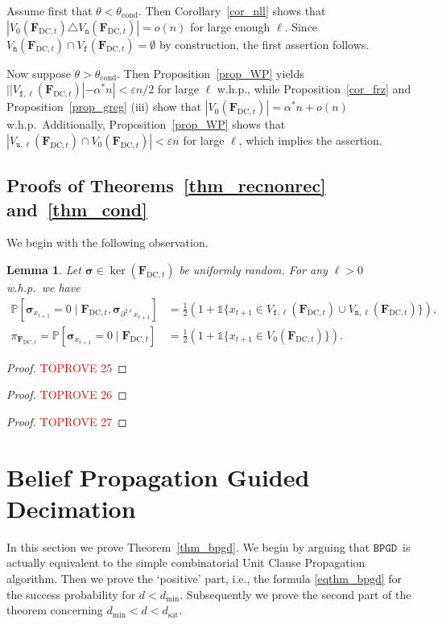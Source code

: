 \documentclass[10pt,reqno]{amsart}
\numberwithin{equation}{section}
\renewcommand{\vec}[1]{\boldsymbol{#1}}
\newcommand\dmin{d_{\mathrm{min}}}
\newcommand\dsat{d_{\mathrm{sat}}}
\newcommand{\FDC}[1]{\PHI_{\mathrm{DC},{#1}}}
\newcommand{\tcond}{\theta_{\mathrm{cond}}}
\newcommand{\frz}{V_0}
\newcommand{\frozen}{\mathtt{f}}
\newcommand{\unfrozen}{\mathtt{u}}
\newcommand{\nll}{\mathtt{n}}
\newcommand{\fzn}{\frozen}
\newcommand{\uzn}{\unfrozen}
\newcommand{\BPGD}{\ensuremath{\mathtt{BPGD}}}
\newcommand\PHI{\vec F}
\newcommand\SIGMA{\vec\sigma}
\newcommand\eps{\varepsilon}
\newcommand{\vecone}{\mathbb{1}}
\newcommand\bc[1]{\left({#1}\right)}
\newcommand\brk[1]{\left\lbrack{#1}\right\rbrack}
\newcommand{\whp}{w.h.p.}
\newcommand\pr{\mathbb{P}}
\newcommand\Prop{Proposition}
\newcommand\Thm{Theorem}
\newcommand\Cor{Corollary}
\newtheorem{lemma}[definition]{Lemma}
\def\pr{{\mathbb P}}
\begin{document}
Assume first that $\theta<\tcond$.
Then \Cor~\ref{cor_nll} shows that $|\frz(\FDC t)\triangle V_{\nll}(\FDC t)|=o(n)$ for large enough $\ell$.
Since $V_{\nll}(\FDC t)\cap V_{\fzn}(\FDC t)=\emptyset$ by construction, the first assertion follows. 

Now suppose $\theta>\tcond$.
Then \Prop~\ref{prop_WP} yields $||V_{\fzn,\ell}(\FDC t)|-\alpha^*n|<\eps n/2$ for large $\ell$ \whp, while \Prop~\ref{cor_frz} and \Prop~\ref{prop_greg} (iii) show that $|\frz(\FDC t)|=\alpha^*n+o(n)$ \whp\
Additionally, \Prop~\ref{prop_WP} shows that $|V_{\uzn,\ell}(\FDC t)\cap \frz(\FDC t)|<\eps n$ for large $\ell$, which implies the assertion.
	
\subsection{Proofs of \Thm s~\ref{thm_recnonrec} and~\ref{thm_cond}}\label{sec_thm_recnonrec}
We begin with the following observation.

\begin{lemma}\label{prop_recon}
	Let $\SIGMA\in\ker(\FDC t)$ be uniformly random.
	For any $\ell>0$ \whp\ we have
	\begin{align}\label{eq_prop_recon_mu}
		\pr\brk{\SIGMA_{x_{t+1}}=0\mid\FDC t,\SIGMA_{\partial^{2\ell} x_{t+1}}}&=\frac12\bc{1+\vecone\{x_{t+1}\in V_{\fzn,\ell}(\FDC t)\cup V_{\nll,\ell}(\FDC t)\}},\\
		\pi_{\FDC{t}}=\pr\brk{\SIGMA_{x_{t+1}}=0\mid\FDC t}&=\frac12\bc{1+\vecone\{x_{t+1}\in \frz(\FDC t)\}}.\label{eq_prop_recon_pi}
	\end{align}
\end{lemma}
\begin{proof}\textcolor{red}{TOPROVE 25}\end{proof}


\begin{proof}\textcolor{red}{TOPROVE 26}\end{proof}


\begin{proof}\textcolor{red}{TOPROVE 27}\end{proof}

\section{Belief Propagation Guided Decimation}\label{sec_alg}

\noindent
In this section we prove \Thm~\ref{thm_bpgd}.
We begin by arguing that \BPGD\ is actually equivalent to the simple combinatorial Unit Clause Propagation algorithm.
Then we prove the `positive' part, i.e., the formula \eqref{eqthm_bpgd} for the success probability for $d<\dmin$.
Subsequently we prove the second part of the theorem concerning $\dmin<d<\dsat$.
\end{document}
